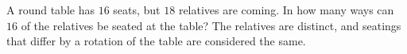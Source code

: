 A round table has $16$ seats, but $18$ relatives are coming. In how many ways can $16$ of the relatives be seated at the table? The relatives are distinct, and seatings that differ by a rotation of the table are considered the same.
